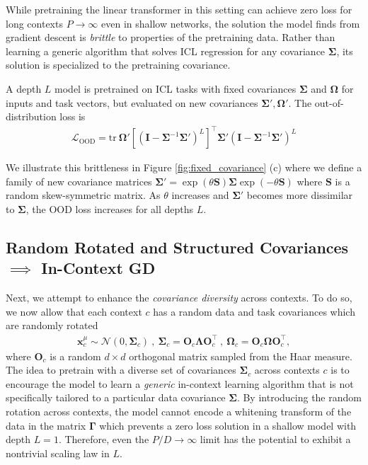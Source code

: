 \documentclass{article} %
\def\x{\bm x}
\begin{document}
While pretraining the linear transformer in this setting can achieve zero loss for long contexts $P \to \infty$ even in shallow networks, the solution the model finds from gradient descent is \textit{brittle} to properties of the pretraining data. Rather than learning a generic algorithm that solves ICL regression for any covariance $\bm\Sigma$, its solution is specialized to the pretraining covariance.  

\begin{tcolorbox}[colframe=myblue, opacityback=0.95, title=Result 5: Brittleness of Fully Trained Model to Distribution Shift (OOD Loss)]  
    A depth $L$ model is pretrained on ICL tasks with fixed covariances $\bm\Sigma$ and $\bm\Omega$ for inputs and task vectors, but evaluated on new covariances $\bm\Sigma', \bm\Omega'$. The out-of-distribution loss is
    \begin{align}
        \mathcal L_{\text{OOD}} = \text{tr} \ \bm\Omega'  \left[\left( \bm I - \bm\Sigma^{-1} \bm\Sigma' \right)^{L}\right]^\top \bm\Sigma' \left( \bm I - \bm\Sigma^{-1} \bm\Sigma' \right)^{L}
    \end{align}
\end{tcolorbox}
We illustrate this brittleness in Figure \ref{fig:fixed_covariance} (c) where we define a family of new covariance matrices $\bm\Sigma' = \exp( \theta \bm S ) \bm \Sigma \exp( - \theta \bm S)$ where $\bm S$ is a random skew-symmetric matrix. As $\theta$ increases and $\bm\Sigma'$ becomes more dissimilar to $\bm\Sigma$, the OOD loss increases for all depths $L$.

\vspace{-10pt}
\subsection{Random Rotated and Structured Covariances $\implies$ In-Context GD} 
\vspace{-10pt}

Next, we attempt to enhance the \textit{covariance diversity} across contexts. To do so, we now allow that each context $c$ has a random data and task covariances which are randomly rotated
\begin{align}
    \x^\mu_c \sim \mathcal{N}\left( 0 , \bm\Sigma_c \right) \ , \  \bm\Sigma_c = \bm O_c \bm\Lambda \bm O_c^\top  \ , \ \bm\Omega_c = \bm O_c \bm \Omega \bm O_c^\top  , 
\end{align}
where $\bm O_c$ is a random $d\times d$ orthogonal matrix sampled from the Haar measure. The idea to pretrain with a diverse set of covariances $\bm\Sigma_c$ across contexts $c$ is to encourage the model to learn a \textit{generic} in-context learning algorithm that is not specifically tailored to a particular data covariance $\bm\Sigma$. %
By introducing the random rotation across contexts, the model cannot encode a whitening transform of the data in the matrix $\bm\Gamma$ which prevents a zero loss solution in a shallow model with depth $L=1$. Therefore, even the $P/D \to \infty$ limit has the potential to exhibit a nontrivial scaling law in $L$. 
\end{document}
